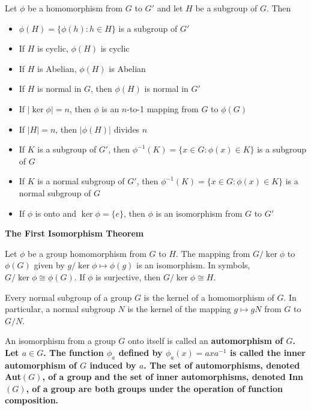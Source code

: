 \documentclass{hmwk}
\begin{document}
\begin{prop}
Let $\phi$ be a homomorphism from $G$ to $G'$ and let $H$ be a subgroup of $G$. Then
\begin{itemize}
    \item $\phi(H) = \{\phi(h) : h \in H\}$ is a subgroup of $G'$
    \item If $H$ is cyclic, $\phi(H)$ is cyclic
    \item If $H$ is Abelian, $\phi(H)$ is Abelian
    \item If $H$ is normal in $G$, then $\phi(H)$ is normal in $G'$
    \item If $|\ker \phi| = n$, then $\phi$ is an $n$-to-1 mapping from $G$ to $\phi(G)$
    \item If $|H| = n$, then $|\phi(H)|$ divides $n$
    \item If $K$ is a subgroup of $G'$, then $\phi^{-1}(K) = \{x \in G : \phi(x) \in K\}$ is a subgroup of $G$
    \item If $K$ is a normal subgroup of $G'$, then $\phi^{-1}(K) = \{x \in G : \phi(x) \in K\}$ is a normal subgroup of $G$
    \item If $\phi$ is onto and $\ker \phi = \{e\}$, then $\phi$ is an isomorphism from $G$ to $G'$
\end{itemize}
\end{prop}

\begin{important}
\bf{The First Isomorphism Theorem}

Let $\phi$ be a group homomorphism from $G$ to $H$. The mapping from $G/\ker\phi$ to $\phi(G)$ given by $g/\ker\phi \mapsto \phi(g)$ is an isomorphism. In symbols, $G/\ker\phi \cong \phi(G)$. If $\phi$ is surjective, then $G/\ker\phi \cong H$.
\end{important}

\begin{prop}
Every normal subgroup of a group $G$ is the kernel of a homomorphism of $G$. In particular, a normal subgroup $N$ is the kernel of the mapping $g \mapsto gN$ from $G$ to $G/N$.
\end{prop}

\begin{defn}
An isomorphism from a group $G$ onto itself is called an \bf{automorphism} of $G$. Let $a \in G$. The function $\phi_a$ defined by $\phi_a(x) = axa^{-1}$ is called the \bf{inner automorphism} of $G$ induced by $a$. The set of automorphisms, denoted Aut$(G)$, of a group and the set of inner automorphisms, denoted Inn$(G)$, of a group are both groups under the operation of function composition.
\end{defn}
\end{document}
